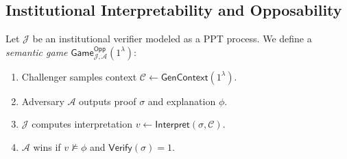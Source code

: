 \documentclass[preprint,12pt]{elsarticle}
\begin{document}
        \subsection{Institutional Interpretability and Opposability}
            \label{subsec:interpretability_opp}

            Let $\mathcal{J}$ be an institutional verifier modeled as a PPT process. We define a \emph{semantic game} $\mathsf{Game}_{\mathcal{J},\mathcal{A}}^{\mathsf{Opp}}(1^\lambda)$:
            \begin{enumerate}
                \item Challenger samples context $\mathcal{C} \gets \mathsf{GenContext}(1^\lambda)$.
                \item Adversary $\mathcal{A}$ outputs proof $\sigma$ and explanation $\phi$.
                \item $\mathcal{J}$ computes interpretation $v \gets \mathsf{Interpret}(\sigma, \mathcal{C})$.
                \item $\mathcal{A}$ wins if $v \not\models \phi$ and $\mathsf{Verify}(\sigma)=1$.
            \end{enumerate}
\end{document}
